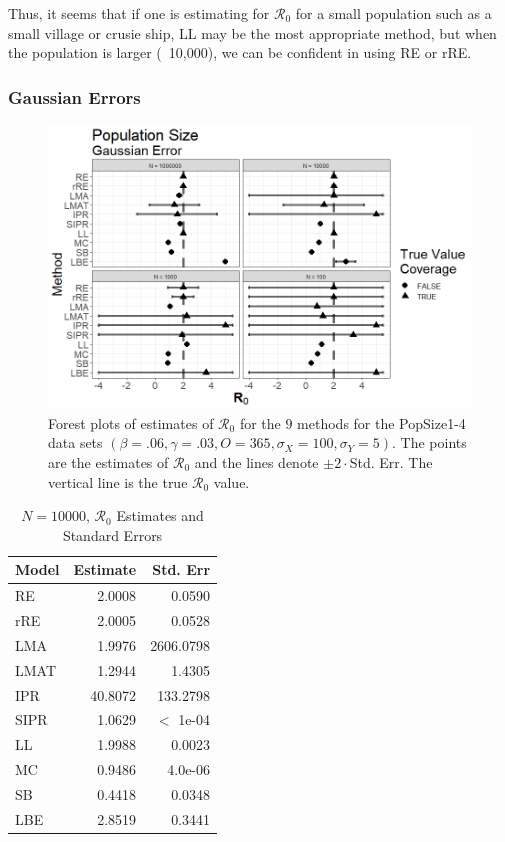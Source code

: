 \documentclass[12pt]{article}
\newcommand{\xxsir}{\ensuremath{9} } %
\newcommand{\rr}{\ensuremath{\mathcal{R}_0}}
\begin{document}
Thus, it seems that if one is estimating for $\rr$ for a small population such as a small village or crusie ship, LL may be the most appropriate method, but when the population is larger (~10,000), we can be confident in using RE or rRE.

\subsubsection{Gaussian Errors}

\begin{figure}[H]
	\centering
	\includegraphics[scale=0.5]{images/popsize_n.tiff}
	\caption{Forest plots of estimates of $\rr$ for the \xxsir methods for the PopSize1-4 data sets $(\beta=.06, \gamma=.03, O=365, \sigma_X=100, \sigma_Y=5)$.  The points are the estimates of $\rr$ and the lines denote $\pm 2\cdot $Std. Err.  The vertical line is the true $\rr$ value.}\label{fig:inits-res2}
\end{figure}

\begin{table}[H]
	
	\centering
	\begin{tabular}[t]{l|r|r}
		\hline
		Model & Estimate & Std. Err\\
		\hline
		RE & 2.0008 & 0.0590\\
		\hline
		rRE & 2.0005 & 0.0528\\
		\hline
		LMA & 1.9976 & 2606.0798\\
		\hline
		LMAT & 1.2944 & 1.4305\\
		\hline
		IPR & 40.8072 & 133.2798\\
		\hline
		SIPR & 1.0629 &  $<$ 1e-04\\
		\hline
		LL & 1.9988 & 0.0023\\
		\hline
		MC & 0.9486 & 4.0e-06\\
		\hline
		SB & 0.4418 & 0.0348\\
		\hline
		LBE & 2.8519 & 0.3441\\
		\hline
	\end{tabular}
\caption{$N = 10000$, $\rr$ Estimates and Standard Errors}\label{tab:n1-res2}
\end{table}
\end{document}
